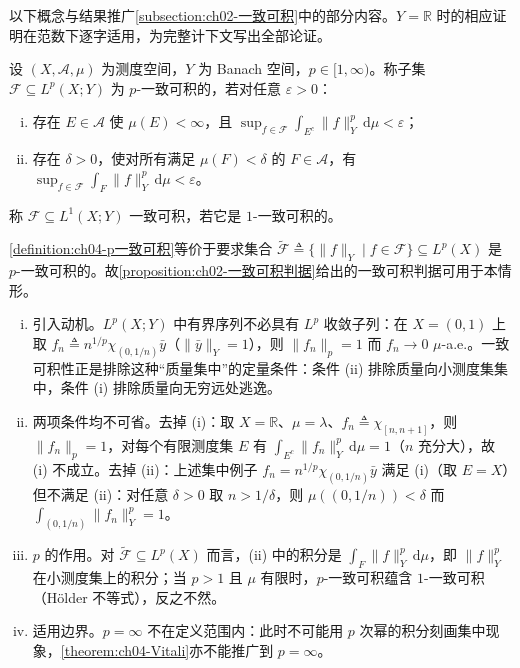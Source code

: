\documentclass[../../main.tex]{subfiles}%
\begin{document}
以下概念与结果推广\cref{subsection:ch02-一致可积}中的部分内容。$Y=\mathbb{R}$ 时的相应证明在范数下逐字适用，为完整计下文写出全部论证。

\begin{definition}[$p$-一致可积]\label{definition:ch04-p一致可积}
设 $(X,\mathcal{A},\mu)$ 为测度空间，$Y$ 为 Banach 空间，$p\in[1,\infty)$。称子集 $\mathcal{F}\subseteq L^p(X;Y)$ 为 $p$-一致可积的，若对任意 $\varepsilon>0$：
\begin{enumerate}[(i)]
\item\label{item:ch04-p一致可积-i} 存在 $E\in\mathcal{A}$ 使 $\mu(E)<\infty$，且 $\sup_{f\in\mathcal{F}}\int_{E^c}\|f\|_Y^p\,\mathrm{d}\mu<\varepsilon$；
\item\label{item:ch04-p一致可积-ii} 存在 $\delta>0$，使对所有满足 $\mu(F)<\delta$ 的 $F\in\mathcal{A}$，有 $\sup_{f\in\mathcal{F}}\int_F\|f\|_Y^p\,\mathrm{d}\mu<\varepsilon$。
\end{enumerate}
称 $\mathcal{F}\subseteq L^1(X;Y)$ 一致可积，若它是 $1$-一致可积的。
\end{definition}

\begin{remark}\label{remark:ch04-p一致可积}
\cref{definition:ch04-p一致可积}等价于要求集合 $\widetilde{\mathcal{F}}\triangleq \{\|f\|_Y\mid f\in\mathcal{F}\}\subseteq L^p(X)$ 是 $p$-一致可积的。故\cref{proposition:ch02-一致可积判据}给出的一致可积判据可用于本情形。

\begin{enumerate}[(i)]
\item 引入动机。$L^p(X;Y)$ 中有界序列不必具有 $L^p$ 收敛子列：在 $X=(0,1)$ 上取 $f_n\triangleq n^{1/p}\chi_{(0,1/n)}\bar y$（$\|\bar y\|_Y=1$），则 $\|f_n\|_p=1$ 而 $f_n\to0$ $\mu$-a.e.。一致可积性正是排除这种“质量集中”的定量条件：条件 (ii) 排除质量向小测度集集中，条件 (i) 排除质量向无穷远处逃逸。

\item 两项条件均不可省。去掉 (i)：取 $X=\mathbb{R}$、$\mu=\lambda$、$f_n\triangleq\chi_{[n,n+1]}$，则 $\|f_n\|_p=1$，对每个有限测度集 $E$ 有 $\int_{E^c}\|f_n\|_Y^p\,\mathrm{d}\mu=1$（$n$ 充分大），故 (i) 不成立。去掉 (ii)：上述集中例子 $f_n=n^{1/p}\chi_{(0,1/n)}\bar y$ 满足 (i)（取 $E=X$）但不满足 (ii)：对任意 $\delta>0$ 取 $n>1/\delta$，则 $\mu((0,1/n))<\delta$ 而 $\int_{(0,1/n)}\|f_n\|_Y^p=1$。

\item $p$ 的作用。对 $\widetilde{\mathcal{F}}\subseteq L^p(X)$ 而言，(ii) 中的积分是 $\int_F\|f\|_Y^p\,\mathrm{d}\mu$，即 $\|f\|_Y^p$ 在小测度集上的积分；当 $p>1$ 且 $\mu$ 有限时，$p$-一致可积蕴含 $1$-一致可积（Hölder 不等式），反之不然。

\item 适用边界。$p=\infty$ 不在定义范围内：此时不可能用 $p$ 次幂的积分刻画集中现象，\cref{theorem:ch04-Vitali}亦不能推广到 $p=\infty$。
\end{enumerate}
\end{remark}
\end{document}
